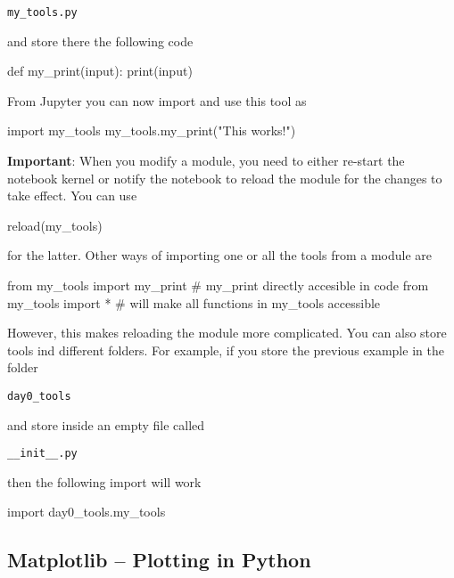 \begin{verbatim}
my_tools.py
\end{verbatim}

\noindent and store there the following code 

\begin{python}
def my_print(input):
    print(input)
\end{python}

From Jupyter you can now import and use this tool as

\begin{python}
import my_tools
my_tools.my_print("This works!") 
\end{python}

\textbf{Important}: When you modify a module, you need to either re-start the notebook kernel or notify the notebook to reload the module for the changes to take effect. You can use

\begin{python}
reload(my_tools)
\end{python}

\noindent for the latter. Other ways of importing one or all the tools from a module are

\begin{python}
from my_tools import my_print  # my_print directly accesible in code
from my_tools import *         # will make all functions in my_tools accessible
\end{python}

\noindent However, this makes reloading the module more complicated. You can also store tools ind different folders. For example, if you store the previous
example in the folder

\begin{verbatim}
day0_tools
\end{verbatim}

\noindent and store inside an empty file called  

\begin{verbatim}
__init__.py
\end{verbatim}

\noindent then the following import will work

\begin{python}
import day0_tools.my_tools
\end{python}


\subsection{Matplotlib -- Plotting in Python}

